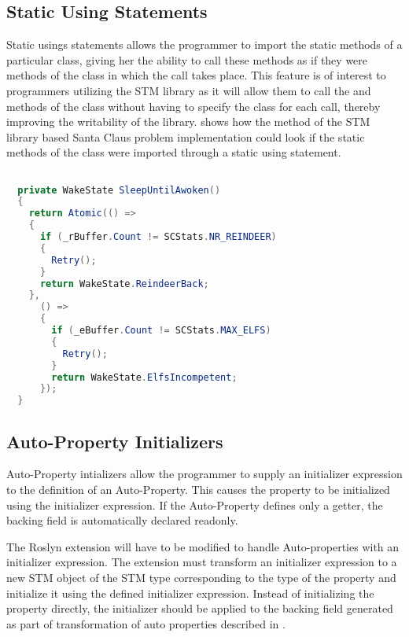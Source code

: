 \subsection{Static Using Statements}
Static usings statements allows the programmer to import the static methods of a particular class, giving her the ability to call these methods as if they were methods of the class in which the call takes place\cite{csharp6one}\cite{csharp6featureDescription}. This feature is of interest to programmers utilizing the \ac{STM} library as it will allow them to call the  and  methods of the  class without having to specify the class for each call, thereby improving the writability of the library.  shows how the  method of the \ac{STM} library based Santa Claus problem implementation could look if the static methods of the  class were imported through a static using statement.

\begin{lstlisting}[float,label=lst:static_using_example,
  caption={\ac{STM} library with static using statement},
  language=Java,  
  showspaces=false,
  showtabs=false,
  breaklines=true,
  showstringspaces=false,
  breakatwhitespace=true,
  escapechar=~,
  commentstyle=\color{greencomments},
  keywordstyle=\color{bluekeywords},
  stringstyle=\color{redstrings},
  morekeywords={atomic, retry, orelse, var, get, set, ref, out}]  % Start your code-block

  private WakeState SleepUntilAwoken()
  {
    return Atomic(() =>
    {
      if (_rBuffer.Count != SCStats.NR_REINDEER)
      {
        Retry();
      }
      return WakeState.ReindeerBack;
    },
      () =>
      {
        if (_eBuffer.Count != SCStats.MAX_ELFS)
        {
          Retry();
        }
        return WakeState.ElfsIncompetent;
      });
  }
\end{lstlisting}

\subsection{Auto-Property Initializers}
Auto-Property intializers allow the programmer to supply an initializer expression to the definition of an Auto-Property\cite{csharp6one}\cite{csharp6two}\cite{csharp6featureDescription}. This causes the property  to be initialized using the initializer expression. If the Auto-Property defines only a getter, the backing field is automatically declared readonly\cite{csharp6one}\cite{csharp6featureDescription}. 

The Roslyn extension will have to be modified to handle  Auto-properties with an initializer expression. The extension must transform an initializer expression to a new \ac{STM} object of the \ac{STM} type corresponding to the type of the  property and initialize it using the defined initializer expression. Instead of initializing the property directly, the initializer should be applied to the backing field generated as part of transformation of  auto properties described in .

\worksheetend
